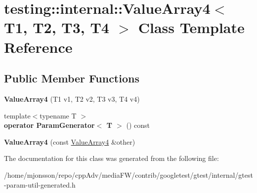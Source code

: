 \hypertarget{classtesting_1_1internal_1_1ValueArray4}{}\section{testing\+:\+:internal\+:\+:Value\+Array4$<$ T1, T2, T3, T4 $>$ Class Template Reference}
\label{classtesting_1_1internal_1_1ValueArray4}
\subsection*{Public Member Functions}
\begin{DoxyCompactItemize}
\item 
\mbox{\label{classtesting_1_1internal_1_1ValueArray4_a5288bbb1a3149842ab13d689cf1fd48f}} 
{\bfseries Value\+Array4} (T1 v1, T2 v2, T3 v3, T4 v4)
\item 
\mbox{\label{classtesting_1_1internal_1_1ValueArray4_aef21f582b20423f5fb8515d9879ad557}} 
{\footnotesize template$<$typename T $>$ }\\{\bfseries operator Param\+Generator$<$ T $>$} () const
\item 
\mbox{\label{classtesting_1_1internal_1_1ValueArray4_a3703e95dc214c47d705cf68fdf2e262b}} 
{\bfseries Value\+Array4} (const \hyperlink{classtesting_1_1internal_1_1ValueArray4}{Value\+Array4} \&other)
\end{DoxyCompactItemize}


The documentation for this class was generated from the following file\+:\begin{DoxyCompactItemize}
\item 
/home/mjonsson/repo/cpp\+Adv/media\+F\+W/contrib/googletest/gtest/internal/gtest-\/param-\/util-\/generated.\+h\end{DoxyCompactItemize}
